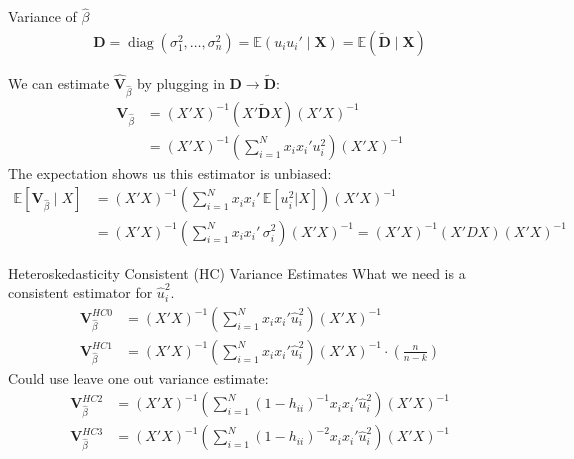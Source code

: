 \documentclass[aspectratio=169,11pt]{beamer}
\begin{document}
\begin{frame}{Variance of $\widehat{\beta}$}
\begin{align*}
\mathbf { D } = \operatorname { diag } \left( \sigma _ { 1 } ^ { 2 } , \ldots , \sigma _ { n } ^ { 2 } \right)
= \mathbb { E } \left( u_i u_i'  \mid \mathbf { X } \right)
= \mathbb { E } \left( \widetilde{\mathbf{D}} \mid  \mathbf { X } \right)
\end{align*}

We can estimate $\widehat{\mathbf{V}}_{\widehat{\beta}}$ by plugging in $\mathbf{D} \rightarrow  \widetilde{\mathbf{D}} $:
\begin{align*}
\mathbf{V}_{\widehat{\beta}} &= (X'X)^{-1} (X'  \widetilde{\mathbf{D}} X) (X'X)^{-1} \\
&= (X'X)^{-1} \left(\sum_{i=1}^N x_i x_i' u_i^2  \right) (X'X)^{-1} 
\end{align*}
The expectation shows us this estimator is unbiased:
\begin{align*}
\mathbb{E}[\mathbf{V}_{\widehat{\beta}} \mid X]
&= (X'X)^{-1} \left(\sum_{i=1}^N x_i x_i'\, \mathbb{E}[u_i^2 | X] \right) (X'X)^{-1} \\
&= (X'X)^{-1} \left(\sum_{i=1}^N x_i x_i' \, \sigma_i^2 \right) (X'X)^{-1} = (X'X)^{-1} (X' D X) (X'X)^{-1} 
\end{align*}
\end{frame}



\begin{frame}{Heteroskedasticity Consistent (HC) Variance Estimates}
What we need is a consistent estimator for $\hat{u}^2_i$.
\begin{align*}
\mathbf{V}_{\widehat{\beta}}^{HC0}&= (X'X)^{-1} \left(\sum_{i=1}^N x_i x_i' \hat{u}_i^2 \right) (X'X)^{-1} \\
\mathbf{V}_{\widehat{\beta}}^{HC1}&= (X'X)^{-1} \left(\sum_{i=1}^N x_i x_i' \hat{u}_i^2 \right) (X'X)^{-1} \cdot \left(\frac{n}{n-k}  \right)
\end{align*}
Could use leave one out variance estimate:
\begin{align*}
\mathbf{V}_{\widehat{\beta}}^{HC2}&= (X'X)^{-1} \left(\sum_{i=1}^N (1-h_{ii})^{-1} x_i x_i' \hat{u}_i^2 \right) (X'X)^{-1} \\
\mathbf{V}_{\widehat{\beta}}^{HC3}&= (X'X)^{-1} \left(\sum_{i=1}^N (1-h_{ii})^{-2} x_i x_i' \hat{u}_i^2 \right) (X'X)^{-1} \\
\end{align*}
\end{frame}
\end{document}
